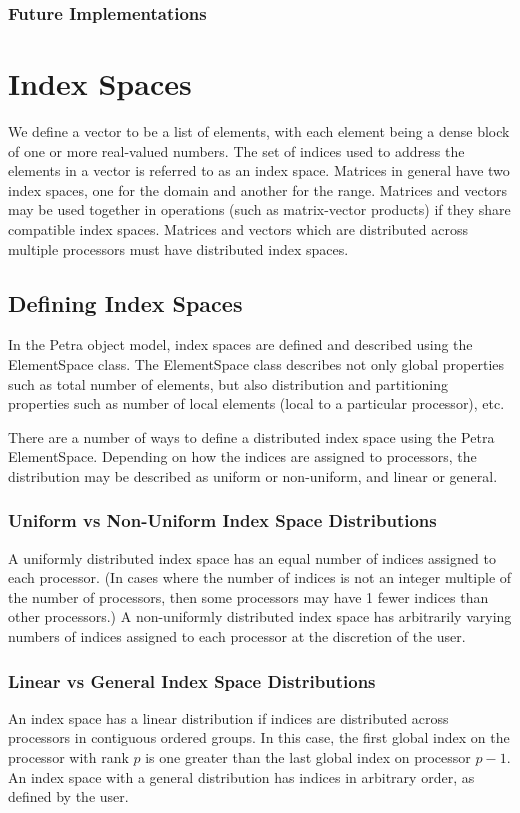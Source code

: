 \documentclass[12pt,relax]{PetraObjectModel}
\begin{document}
\subsubsection{Future Implementations}


\section{Index Spaces}
We define a vector to be a list of elements, with each element being a
dense block of one or more real-valued numbers. The set of indices used to
address the elements in a vector is referred to as an index space. Matrices
in general have two index spaces, one for the domain and another for the
range. Matrices and vectors may be used together in operations (such as
matrix-vector products) if they share compatible index spaces. Matrices
and vectors which are distributed across multiple processors must have
distributed index spaces.

\subsection{Defining Index Spaces}
In the Petra object model, index spaces are defined and described using the
ElementSpace class. The ElementSpace class describes not only global properties
such as total
number of elements, but also distribution and partitioning properties such as
number of local elements (local to a particular processor), etc.
 
There are a number of ways to define a distributed index space using the Petra
ElementSpace. Depending on how the indices are assigned to processors, the
distribution
may be described as uniform or non-uniform, and linear or general.

\subsubsection{Uniform vs Non-Uniform Index Space Distributions}
A uniformly distributed index space has an equal number of indices assigned
to each processor. (In cases where the number of indices is not an integer
multiple of the number of processors, then some processors may have 1 fewer
indices than other processors.) A non-uniformly distributed index space has
arbitrarily varying numbers of indices assigned to each processor at
the discretion of the user.

\subsubsection{Linear vs General Index Space Distributions}
An index space has a linear distribution if indices are distributed across
processors in contiguous ordered groups. In this case, the first global index
on the processor with rank $p$ is one greater than the last global index on
processor $p-1$. An index space with
a general distribution has indices in arbitrary order, as defined by the user.
\end{document}
